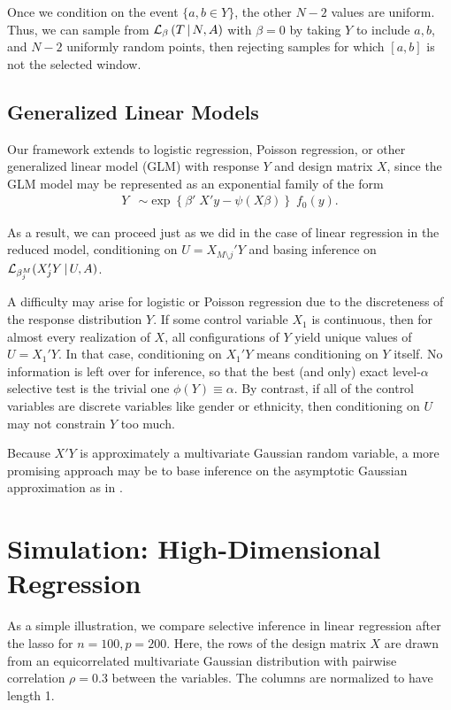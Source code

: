 \documentclass{article}
\theoremstyle{definition}
\newcommand{\bX}{X}
\newcommand{\cL}{\mathcal{L}}
\begin{document}
Once we condition on the event $\{a,b\in Y\}$, the other $N-2$ values are uniform. Thus, we can sample from $\cL_\beta\left(T \gv N, A\right)$ with $\beta=0$ by taking $Y$ to include $a, b$, and $N-2$ uniformly random points, then rejecting samples for which $[a,b]$ is not the selected window.


\subsection{Generalized Linear Models}\label{sec:glm}

Our framework extends to logistic regression, Poisson regression, or other generalized linear model (GLM) with response $Y$ and design matrix $\bX$, since the GLM model may be represented as an exponential family of the form
\begin{align}
  Y &\sim \exp\left\{ \beta'\;\bX'y -
    \psi(\bX\beta)\right\}\; f_0(y).
\end{align}

As a result, we can proceed just as we did in the case of linear regression in the reduced model, conditioning on $U={\bX_{M\setminus j}}'Y$ and basing inference on $\cL_{\beta_j^{M}}(X_j'Y \gv U, A)$.

A difficulty may arise for logistic or Poisson regression due to the discreteness of the response distribution $Y$. If some control variable $X_1$ is continuous, then for almost every realization of $X$, all configurations of $Y$ yield unique values of $U=X_1'Y$. In that case, conditioning on $X_1'Y$ means conditioning on $Y$ itself. No information is left over for inference, so that the best (and only) exact level-$\alpha$ selective test is the trivial one $\phi(Y)\equiv\alpha$. By contrast, if all of the control variables are discrete variables like gender or ethnicity, then conditioning on $U$ may not constrain $Y$ too much.

Because $\bX'Y$ is approximately a multivariate Gaussian random variable, a more promising approach may be to base inference on the asymptotic Gaussian approximation as in \citet{taylor2016post}.

\section{Simulation: High-Dimensional Regression}\label{sec:simulation}

As a simple illustration, we compare selective inference in linear regression after the lasso for $n=100,p=200$. Here, the rows of the design matrix $\bX$ are drawn from an equicorrelated multivariate Gaussian distribution with pairwise correlation $\rho=0.3$ between the variables. The columns are normalized to
have length 1.
\end{document}
